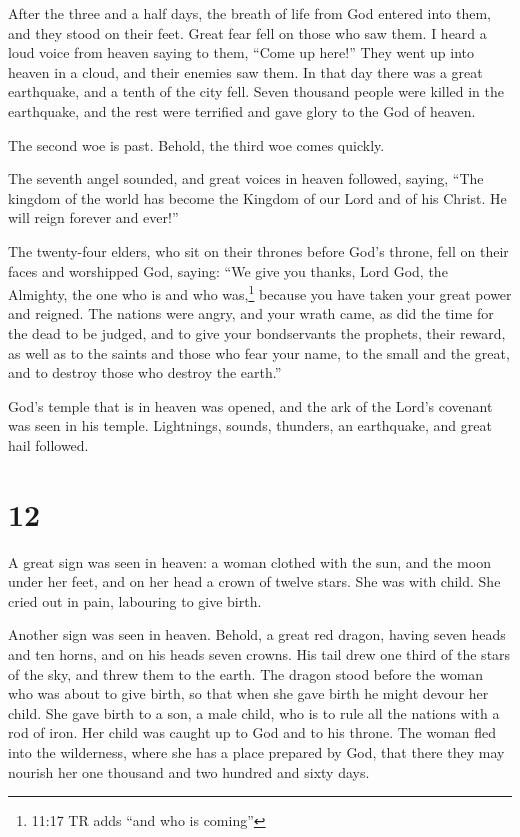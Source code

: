  After the three and a half days, the breath of life from
God entered into them, and they stood on their feet. Great fear fell on
those who saw them.  I heard a loud voice from heaven
saying to them, ``Come up here!'' They went up into heaven in a cloud,
and their enemies saw them.  In that day there was a great
earthquake, and a tenth of the city fell. Seven thousand people were
killed in the earthquake, and the rest were terrified and gave glory to
the God of heaven.

 The second woe is past. Behold, the third woe comes
quickly.

 The seventh angel sounded, and great voices in heaven
followed, saying, ``The kingdom of the world has become the Kingdom of
our Lord and of his Christ. He will reign forever and ever!''

 The twenty-four elders, who sit on their thrones before
God's throne, fell on their faces and worshipped God, 
saying: ``We give you thanks, Lord God, the Almighty, the one who is and
who was,\footnote{11:17 TR adds ``and who is coming''} because you have
taken your great power and reigned.  The nations were
angry, and your wrath came, as did the time for the dead to be judged,
and to give your bondservants the prophets, their reward, as well as to
the saints and those who fear your name, to the small and the great, and
to destroy those who destroy the earth.''

 God's temple that is in heaven was opened, and the ark of
the Lord's covenant was seen in his temple. Lightnings, sounds,
thunders, an earthquake, and great hail followed.

\hypertarget{section-11}{%
\section{12}\label{section-11}}

 A great sign was seen in heaven: a woman clothed with the
sun, and the moon under her feet, and on her head a crown of twelve
stars.  She was with child. She cried out in pain, labouring
to give birth.

 Another sign was seen in heaven. Behold, a great red
dragon, having seven heads and ten horns, and on his heads seven crowns.
 His tail drew one third of the stars of the sky, and threw
them to the earth. The dragon stood before the woman who was about to
give birth, so that when she gave birth he might devour her child.
 She gave birth to a son, a male child, who is to rule all
the nations with a rod of iron. Her child was caught up to God and to
his throne.  The woman fled into the wilderness, where she
has a place prepared by God, that there they may nourish her one
thousand and two hundred and sixty days.

